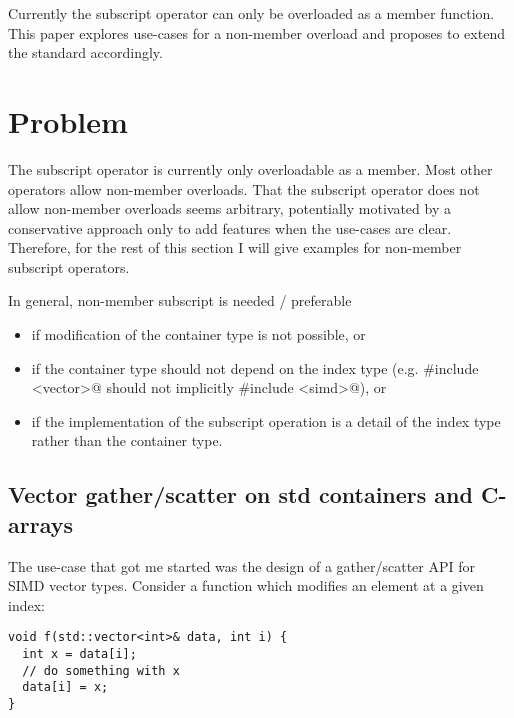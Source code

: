 \newcommand\wgTitle{Non-Member Subscript Operator}
\newcommand\wgName{Matthias Kretz <m.kretz@gsi.de>}
\newcommand\wgDocumentNumber{DNMSOR0}
\newcommand\wgGroup{EWG-I, EWG}
\newcommand\wgTarget{\CC{}23}

\usepackage{mymacros}
\usepackage{wg21}


\newlength\myIndent

\begin{wgTitlepage}
  Currently the subscript operator can only be overloaded as a member function.
  This paper explores use-cases for a non-member overload and proposes to extend
  the standard accordingly.
\end{wgTitlepage}

\section{Problem}
The subscript operator is currently only overloadable as a member.
Most other operators allow non\hyp member overloads.
That the subscript operator does not allow non\hyp member overloads seems
arbitrary, potentially motivated by a conservative approach only to add
features when the use\hyp cases are clear. Therefore, for the rest of this
section I will give examples for non\hyp member subscript operators.

In general, non\hyp member subscript is needed / preferable
\begin{itemize}
  \item if modification of the container type is not possible, or

  \item if the container type should not depend on the index type (e.g.
    \lstinline@#include <vector>@ should not implicitly
    \lstinline@#include <simd>@), or

  \item if the implementation of the subscript operation is a detail of the
    index type rather than the container type.
\end{itemize}

\subsection{Vector gather/scatter on std containers and C-arrays}\label{sec:gatherscatter}
The use\hyp case that got me started was the design of a gather/scatter API for SIMD vector types.
Consider a function  which modifies an element at a given index:
\smallskip\begin{lstlisting}
void f(std::vector<int>& data, int i) {
  int x = data[i];
  // do something with x
  data[i] = x;
}
\end{lstlisting}

